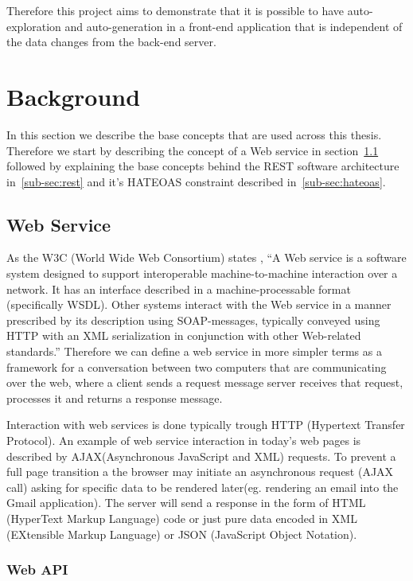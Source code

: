Therefore this project aims to demonstrate that it is possible to have auto-exploration and auto-generation in a front-end application that is independent of the data changes from the back-end server.


\section{Background}
\label{sec:background}

In this section we describe the base concepts that are used across this thesis. Therefore we start by describing the concept of a Web service in section~\ref{sub-sec:web-service} followed by explaining the base concepts behind the REST software architecture in~\ref{sub-sec:rest} and it's HATEOAS constraint described in~\ref{sub-sec:hateoas}.

\subsection{Web Service}
\label{sub-sec:web-service}

As the W3C (World Wide Web Consortium) states \cite{W3C}, ``A Web service is a software system designed to support interoperable machine-to-machine interaction over a network. It has an interface described in a machine-processable format (specifically WSDL). Other systems interact with the Web service in a manner prescribed by its description using SOAP-messages, typically conveyed using HTTP with an XML serialization in conjunction with other Web-related standards.'' Therefore we can define a web service in more simpler terms as a framework for a conversation between two computers that are communicating over the web, where a client sends a request message server receives that request, processes it and returns a response message.

Interaction with web services is done typically trough HTTP (Hypertext Transfer Protocol). An example of web service interaction in today's web pages is described by AJAX(Asynchronous JavaScript and XML) requests.   To prevent a full page transition a the browser may initiate an asynchronous request (AJAX call) asking for specific data to be rendered later(eg. rendering an email into the Gmail application). The server will send a response in the form of HTML (HyperText Markup Language) code or just pure data encoded in XML (EXtensible Markup Language) or JSON (JavaScript Object Notation).

\subsubsection{Web API}
\label{sub-sub-sec:web-api}

